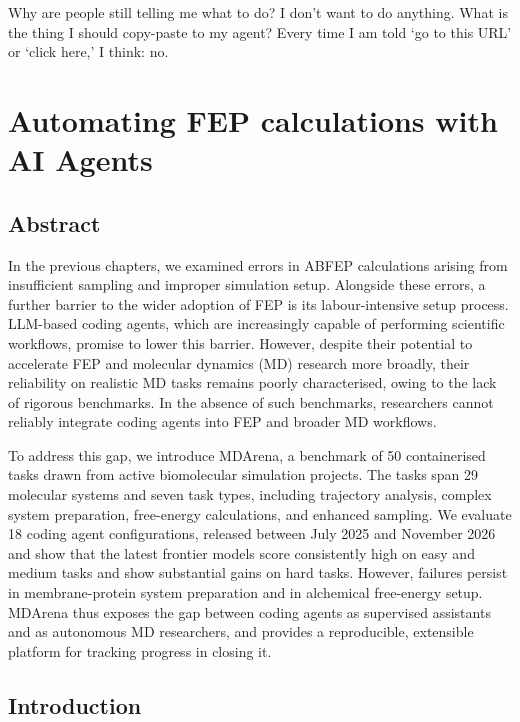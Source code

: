\begin{savequote}[75mm]
Why are people still telling me what to do? I don't want to do anything. What is the thing I should copy-paste to my agent? Every time I am told `go to this URL' or `click here,' I think: no.
\end{savequote}

\chapter{Automating FEP calculations with AI Agents}
\label{ch:automating-abfes-with-ai-agents}
\section*{Abstract}
In the previous chapters, we examined errors in ABFEP calculations arising from insufficient sampling and improper simulation setup. Alongside these errors, a further barrier to the wider adoption of FEP is its labour-intensive setup process. LLM-based coding agents, which are increasingly capable of performing scientific workflows, promise to lower this barrier. However, despite their potential to accelerate FEP and molecular dynamics (MD) research more broadly, their reliability on realistic MD tasks remains poorly characterised, owing to the lack of rigorous benchmarks. In the absence of such benchmarks, researchers cannot reliably integrate coding agents into FEP and broader MD workflows. 

To address this gap, we introduce MDArena, a benchmark of 50 containerised tasks drawn from active biomolecular simulation projects. The tasks span 29 molecular systems and seven task types, including trajectory analysis, complex system preparation, free-energy calculations, and enhanced sampling. We evaluate 18 coding agent configurations, released between July 2025 and November 2026 and show that the latest frontier models score consistently high on easy and medium tasks and show substantial gains on hard tasks. However, failures persist in membrane-protein system preparation and in alchemical free-energy setup. MDArena thus exposes the gap between coding agents as supervised assistants and as autonomous MD researchers, and provides a reproducible, extensible platform for tracking progress in closing it.



\section{Introduction}

